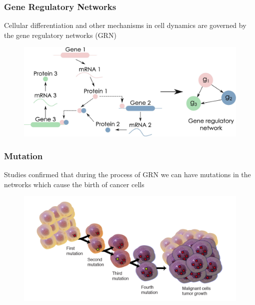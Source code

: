 \documentclass{beamer}
\begin{document}
\begin{frame}
\frametitle{Gene Regulatory Networks}
Cellular differentiation and other mechanisms in cell dynamics are governed by the gene regulatory networks (GRN)

\begin{figure}
\centering
\includegraphics[scale=1]{GRN.png}
\end{figure}
\end{frame}


\begin{frame}
\frametitle{Mutation}

Studies confirmed that during the process of GRN we can have mutations in the networks which cause the birth of cancer cells
\centering

\begin{figure}
\centering
\includegraphics[scale=0.2]{mutation.jpg}
\end{figure}
\end{frame}
\end{document}
